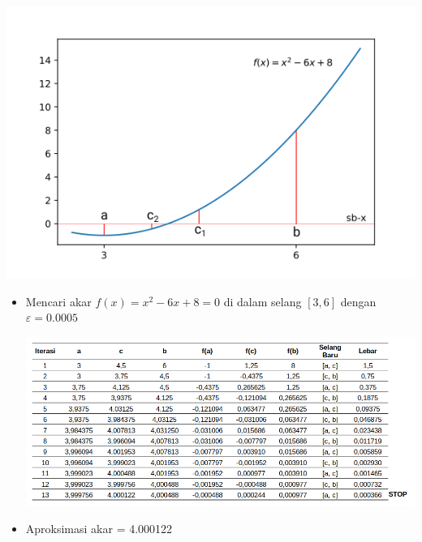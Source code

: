 \documentclass[pdflatex,compress,mathserif]{beamer}
\begin{document}
\begin{frame}
	\begin{center}
		\includegraphics[width=\linewidth]{img/img002}
	\end{center}
\end{frame}

\begin{frame}
	\begin{itemize}
		\item Mencari akar $ f(x) = x^2 - 6x + 8 = 0 $ di dalam selang $ [3, 6] $ dengan $ \varepsilon = 0.0005 $
		
		\begin{center}
			\includegraphics[width=\linewidth]{img/tab001}
		\end{center}
		
		\item Aproksimasi akar = 4.000122
	\end{itemize}
\end{frame}
\end{document}
